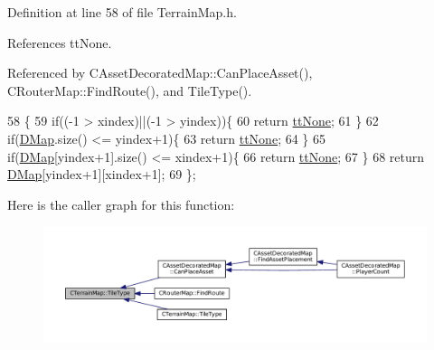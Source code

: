 Definition at line 58 of file Terrain\+Map.\+h.



References tt\+None.



Referenced by C\+Asset\+Decorated\+Map\+::\+Can\+Place\+Asset(), C\+Router\+Map\+::\+Find\+Route(), and Tile\+Type().


\begin{DoxyCode}
58                                                         \{
59             \textcolor{keywordflow}{if}((-1 > xindex)||(-1 > yindex))\{
60                 \textcolor{keywordflow}{return} \hyperlink{classCTerrainMap_aff2ab991e237269941416dd79d8871d4a481e779132fb16414d17870bd6229eb5}{ttNone};    
61             \}
62             \textcolor{keywordflow}{if}(\hyperlink{classCTerrainMap_a80d154ce478948b10473534a7bca13f6}{DMap}.size() <= yindex+1)\{
63                 \textcolor{keywordflow}{return} \hyperlink{classCTerrainMap_aff2ab991e237269941416dd79d8871d4a481e779132fb16414d17870bd6229eb5}{ttNone};   
64             \}
65             \textcolor{keywordflow}{if}(\hyperlink{classCTerrainMap_a80d154ce478948b10473534a7bca13f6}{DMap}[yindex+1].size() <= xindex+1)\{
66                 \textcolor{keywordflow}{return} \hyperlink{classCTerrainMap_aff2ab991e237269941416dd79d8871d4a481e779132fb16414d17870bd6229eb5}{ttNone};   
67             \}
68             \textcolor{keywordflow}{return} \hyperlink{classCTerrainMap_a80d154ce478948b10473534a7bca13f6}{DMap}[yindex+1][xindex+1];
69         \};
\end{DoxyCode}
Here is the caller graph for this function\+:\nopagebreak
\begin{figure}[H]
\begin{center}
\leavevmode
\includegraphics[width=350pt]{classCTerrainMap_a7e0e440467a09cb1c59e2bdbec01ccb4_icgraph}
\end{center}
\end{figure}
\hypertarget{classCTerrainMap_a3a7229412b3391835dd6036439e5c6c0}{}\label{classCTerrainMap_a3a7229412b3391835dd6036439e5c6c0} 

